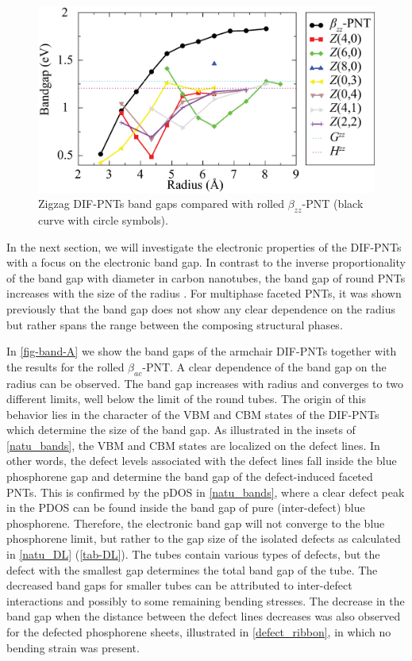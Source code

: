 \begin{figure}[htb]
\centering
\includegraphics[width=0.9\linewidth]{Nanotu_ZB.eps}%
\caption{Zigzag DIF-PNTs band gaps compared with rolled $\beta_{zz}$-PNT (black curve with circle symbols). \label{fig-band-B}}
\end{figure}


In the next section, we will investigate the electronic properties of the DIF-PNTs with a focus on the electronic band gap. In contrast to the inverse proportionality of the band gap with diameter in carbon nanotubes\cite{Odom2000}, the band gap of round PNTs increases with the size of the radius . For multiphase faceted PNTs, it was shown previously that the band gap does not show any clear dependence on the radius but rather spans the range between the composing structural phases\cite{Guan2014a}. 

In \autoref{fig-band-A} we show the band gaps of the armchair DIF-PNTs together with the results for the rolled $\beta_{ac}$-PNT. A clear dependence of the band gap on the radius can be observed. The band gap increases with radius and converges to two different limits, well below the limit of the round tubes. The origin of this behavior lies in the character of the VBM and CBM states of the DIF-PNTs which determine the size of the band gap. As illustrated in the insets of \autoref{natu_bands}, the VBM and CBM states are localized on the defect lines. In other words, the defect levels associated with the defect lines fall inside the blue phosphorene gap and determine the band gap of the defect-induced faceted PNTs. This is confirmed by the pDOS in \autoref{natu_bands}, where a clear defect peak in the PDOS can be found inside the band gap of pure (inter-defect) blue phosphorene. Therefore, the electronic band gap will not converge to the blue phosphorene limit, but rather to the gap size of the isolated defects as calculated in \autoref{natu_DL} (\autoref{tab-DL}). The tubes contain various types of defects, but the defect with the smallest gap determines the total band gap of the tube. The decreased band gaps for smaller tubes can be attributed to inter-defect interactions and possibly to some remaining bending stresses. The decrease in the band gap when the distance between the defect lines decreases was also observed for the defected phosphorene sheets, illustrated in \autoref{defect_ribbon}, in which no bending strain was present.

